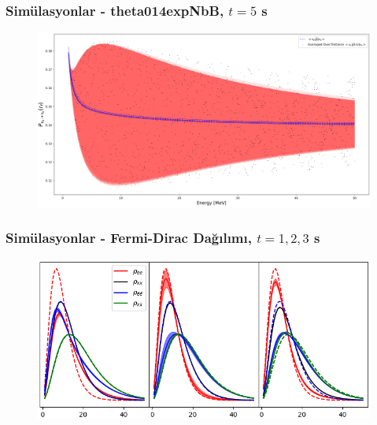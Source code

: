 \documentclass[10pt]{beamer}
\begin{document}
\begin{frame}
    \frametitle{Simülasyonlar - theta014expNbB, $t=5$ s}
    \begin{figure}[hbt!]
        \centering
        \includegraphics[width=\textwidth]{fig/theta014expNbB_energySpec_theta0_averaged.pdf}
    \end{figure}
\end{frame}

\begin{frame}
    \frametitle{Simülasyonlar - Fermi-Dirac Dağılımı, $t=1,2,3$ s}
    \begin{figure}[hbt!]
        \centering
        \includegraphics[width=\textwidth]{fig/yatayFermiSpec_t135.png}
    \end{figure}
\end{frame}
\end{document}
